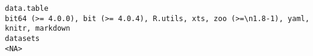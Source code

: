 \documentclass[
  letterpaper,
  DIV=11,
  numbers=noendperiod]{scrreprt}
\begin{document}
\begin{verbatim}
data.table                                                                                                                                                                                                                                                                                                                                                                                                                                                                                                                                                                                                                                                                                                                                                                                                                                                                                                                                                                                                                                                                                                                                                                                                             bit64 (>= 4.0.0), bit (>= 4.0.4), R.utils, xts, zoo (>=\n1.8-1), yaml, knitr, markdown
datasets                                                                                                                                                                                                                                                                                                                                                                                                                                                                                                                                                                                                                                                                                                                                                                                                                                                                                                                                                                                                                                                                                                                                                                                                                                                                                                 <NA>

\end{verbatim}
\end{document}
